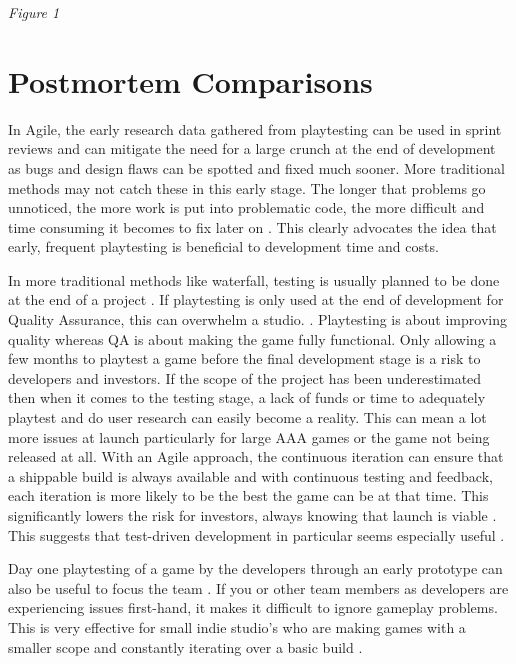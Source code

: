 \documentclass{scrartcl}
\begin{document}
\begin{center}
\textit{Figure 1} \cite{GDCAttn:3}
\end{center}

\section{Postmortem Comparisons}

In Agile, the early research data gathered from playtesting can be used in sprint reviews and can mitigate the need for a large crunch at the end of development as bugs and design flaws can be spotted and fixed much sooner\cite{PMKOA:4}. More traditional methods may not catch these in this early stage. The longer that problems go unnoticed, the more work is put into problematic code, the more difficult and time consuming it becomes to fix later on \cite{GDCOTC:5}. This clearly advocates the idea that early, frequent playtesting is beneficial to development time and costs. \par
In more traditional methods like waterfall, testing is usually planned to be done at the end of a project \cite{ji2011comparing:6}. If playtesting is only used at the end of development for Quality Assurance, this can overwhelm a studio.  \cite{PMTrine:7}. Playtesting is about improving quality whereas QA is about making the game fully functional. Only allowing a few months to playtest a game before the final development stage is a risk to developers and investors. If the scope of the project has been underestimated then when it comes to the testing stage, a lack of funds or time to adequately playtest and do user research can easily become a reality\cite{PMZZ:8}. This can mean a lot more issues at launch particularly for large AAA games \cite{BrokenGames:9} or the game not being released at all. With an Agile approach, the continuous iteration can ensure that a shippable build is always available and with continuous testing and feedback, each iteration is more likely to be the best the game can be at that time. This significantly lowers the risk for investors, always knowing that launch is viable \cite{ghane2017quantitative:10}. This suggests that test-driven development in particular seems especially useful \cite{cunningham2005costs:11}. \par
Day one playtesting of a game by the developers through an early prototype can also be useful to focus the team \cite{Yampolsky:2016:LGD:2896958.2896965:12}. If you or other team members as developers are experiencing issues first-hand, it makes it difficult to ignore gameplay problems. This is very effective for small indie studio's who are making games with a smaller scope and constantly iterating over a basic build \cite{PMNS2:13}.
\end{document}
